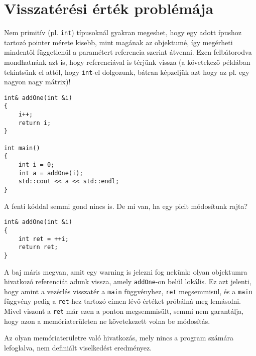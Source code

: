 \documentclass[a4paper,11.5pt]{article}
\begin{document}
	\section{Visszatérési érték problémája}
	Nem primitív (pl. \texttt{int}) típusoknál gyakran megeshet, hogy egy adott ípushoz tartozó pointer mérete kisebb, mint magának az objektumé, így megérheti mindentől függetlenül a paramétert referencia szerint átvenni. Ezen felbátorodva mondhatnánk azt is, hogy referenciával is térjünk vissza (a követekező példában tekintsünk el attól, hogy \texttt{int}-el dolgozunk, bátran képzeljük azt hogy az pl. egy nagyon nagy mátrix)!
	\begin{lstlisting}
int& addOne(int &i)
{
	i++;
	return i;
}

int main()
{
	int i = 0;
	int a = addOne(i);
	std::cout << a << std::endl;
}
	\end{lstlisting}
	A fenti kóddal semmi gond nincs is. De mi van, ha egy picit módosítunk rajta?
	\begin{lstlisting}
int& addOne(int &i)
{
	int ret = ++i;
	return ret;
}
	\end{lstlisting}
	A baj máris megvan, amit egy warning is jelezni fog nekünk: olyan objektumra hivatkozó referenciát adunk vissza, amely \texttt{addOne}-on belül lokális. Ez azt jelenti, hogy amint a vezérlés visszatér a \texttt{main} függvényhez, \texttt{ret} megsemmisül, és a \texttt{main} függvény pedig a \texttt{ret}-hez tartozó címen lévő értéket próbálná meg lemásolni. Mivel viszont a \texttt{ret} már ezen a ponton megsemmisült, semmi nem garantálja, hogy azon a memóriaterületen ne követekezett volna be módosítás.
	
	\medskip
	Az olyan memóriaterületre való hivatkozás, mely nincs a program számára lefoglalva, nem definiált viselkedést eredményez.
	\medskip
	
\end{document}
